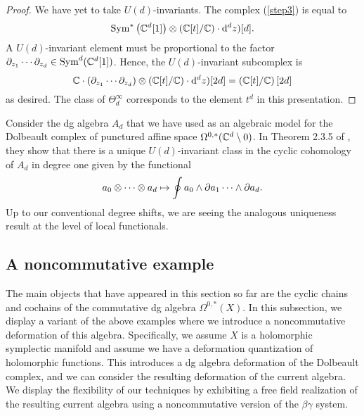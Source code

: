 \begin{proof}
We have yet to take $U(d)$-invariants. 
The complex (\ref{step3}) is equal to
\[
{\rm Sym}^* \left(\mathbb C^d[1]\right) \otimes (\mathbb C [t] / \mathbb C) \cdot {\rm d}^d z) [d] .
\]
A $U(d)$-invariant element must be proportional to the factor $\partial_{z_1} \cdots \partial_{z_d} \in {\rm Sym}^d(\mathbb C^d[1])$.
Hence, the $U(d)$-invariant subcomplex is
\[
\mathbb C \cdot (\partial_{z_1} \cdots \partial_{z_d}) \otimes (\mathbb C [t] / \mathbb C) \cdot {\rm d}^d z) [2d] = \left(\mathbb C[t] / \mathbb C\right) [2d]
\] 
as desired. 
The class of $\Theta^\infty_d$ corresponds to the element $t^{d}$ in this presentation. 
\end{proof}

Consider the dg algebra $A_d$ that we have used as an algebraic model for the Dolbeault complex of punctured affine space $\Omega^{0,*}(\mathbb C^d \setminus 0)$. 
In Theorem 2.3.5 of \cite{FHK}, they show that there is a unique $U(d)$-invariant class in the cyclic cohomology of $A_d$ in degree one given by the functional
\[
a_0 \otimes \cdots \otimes a_d \mapsto \oint a_0 \wedge \partial a_1 \cdots \wedge \partial a_d .
\]
Up to our conventional degree shifts, we are seeing the analogous uniqueness result at the level of local functionals. 


\subsection{A noncommutative example}


The main objects that have appeared in this section so far are the cyclic chains and cochains of the commutative dg algebra $\Omega^{0,*}(X)$. 
In this subsection, we display a variant of the above examples where we introduce a noncommutative deformation of this algebra. 
Specifically, we assume $X$ is a holomorphic symplectic manifold and assume we have a deformation quantization of holomorphic functions.
This introduces a dg algebra deformation of the Dolbeault complex, and we can consider the resulting deformation of the current algebra.
We display the flexibility of our techniques by exhibiting a free field realization of the resulting current algebra using a noncommutative version of the $\beta\gamma$ system. 

